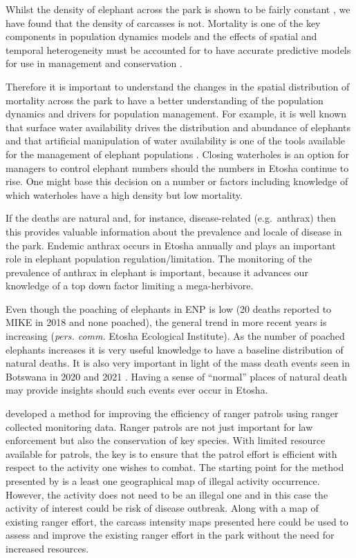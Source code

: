 \documentclass[letterpaper, 12pt]{interact}
\begin{document}
	Whilst the density of elephant across the park is shown to be fairly constant \cite{Craig2020}, we have found that the density of carcasses is not.  Mortality is one of the key components in population dynamics models and the effects of spatial and temporal heterogeneity must be accounted for to have accurate predictive models for use in management and conservation \cite{sibly2009}. 
	
	Therefore it is important to understand the changes in the spatial distribution of mortality across the park to have a better understanding of the population dynamics and drivers for population management.  For example, it is well known that surface water availability drives the distribution and abundance of elephants and that artificial manipulation of water availability is one of the tools available for the management of elephant populations \cite{chamaille2007}.  Closing waterholes is an option for managers to control elephant numbers should the numbers in Etosha continue to rise. One might base this decision on a number or factors including knowledge of which waterholes have a high density but low mortality. 
	
	If the deaths are natural and, for instance, disease-related (e.g.~anthrax) then this provides valuable information about the prevalence and locale of disease in the park. Endemic anthrax occurs in Etosha annually \cite{Turner2013} and plays an important role in elephant population regulation/limitation. The monitoring of the prevalence of anthrax in elephant is important, because it advances our knowledge of a top down factor limiting a mega-herbivore. 
	
	Even though the poaching of elephants in ENP is low (20 deaths reported to MIKE in 2018 and none poached), the general trend in more recent years is increasing (\textit{pers. comm.} Etosha Ecological Institute). As the number of poached elephants increases it is very useful knowledge to have a baseline distribution of natural deaths. It is also very important in light of the mass death events seen in Botswana in 2020 and 2021 \cite{Karombo2021}. Having a sense of ``normal'' places of natural death may provide insights should such events ever occur in Etosha.
	
	\citet{critchlow2017} developed a method for improving the efficiency of ranger patrols using ranger collected monitoring data.  Ranger patrols are not just important for law enforcement but also the conservation of key species. With limited resource available for patrols, the key is to ensure that the patrol effort is efficient with respect to the activity one wishes to combat. The starting point for the method presented by \citet{critchlow2017} is a least one geographical map of illegal activity occurrence. However, the activity does not need to be an illegal one and in this case the activity of interest could be risk of disease outbreak. Along with a map of existing ranger effort, the carcass intensity maps presented here could be used to assess and improve the existing ranger effort in the park without the need for increased resources. 
	
\end{document}
